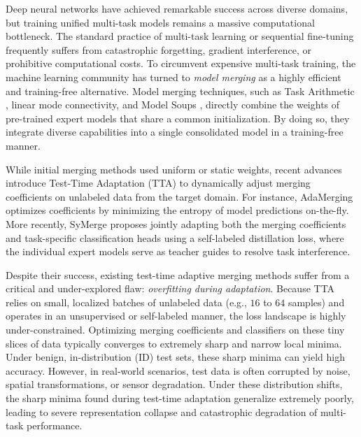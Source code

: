 \documentclass{article}
\begin{document}
Deep neural networks have achieved remarkable success across diverse domains, but training unified multi-task models remains a massive computational bottleneck. The standard practice of multi-task learning or sequential fine-tuning frequently suffers from catastrophic forgetting, gradient interference, or prohibitive computational costs. To circumvent expensive multi-task training, the machine learning community has turned to \emph{model merging} as a highly efficient and training-free alternative. Model merging techniques, such as Task Arithmetic \cite{yang2023adamerging, gargiulo2024task, he2024localizeandstitch}, linear mode connectivity, and Model Soups \cite{lotfy2023detecting, tran2025leveraging}, directly combine the weights of pre-trained expert models that share a common initialization. By doing so, they integrate diverse capabilities into a single consolidated model in a training-free manner.

While initial merging methods used uniform or static weights, recent advances introduce Test-Time Adaptation (TTA) to dynamically adjust merging coefficients on unlabeled data from the target domain. For instance, AdaMerging \cite{yang2023adamerging} optimizes coefficients by minimizing the entropy of model predictions on-the-fly. More recently, SyMerge \cite{symerge2024} proposes jointly adapting both the merging coefficients and task-specific classification heads using a self-labeled distillation loss, where the individual expert models serve as teacher guides to resolve task interference.

Despite their success, existing test-time adaptive merging methods suffer from a critical and under-explored flaw: \emph{overfitting during adaptation}. Because TTA relies on small, localized batches of unlabeled data (e.g., $16$ to $64$ samples) and operates in an unsupervised or self-labeled manner, the loss landscape is highly under-constrained. Optimizing merging coefficients and classifiers on these tiny slices of data typically converges to extremely sharp and narrow local minima. Under benign, in-distribution (ID) test sets, these sharp minima can yield high accuracy. However, in real-world scenarios, test data is often corrupted by noise, spatial transformations, or sensor degradation. Under these distribution shifts, the sharp minima found during test-time adaptation generalize extremely poorly, leading to severe representation collapse and catastrophic degradation of multi-task performance.
\end{document}
